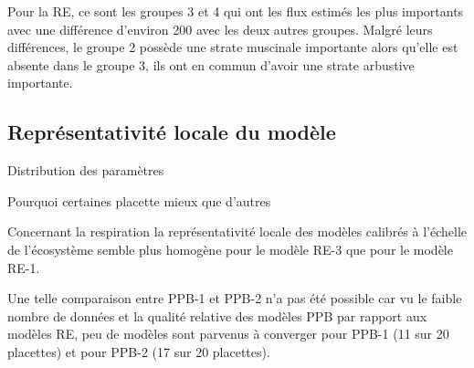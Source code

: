 Pour la RE, ce sont les groupes 3 et 4 qui ont les flux estimés les plus importants avec une différence d'environ \SI{200}{\gcma} avec les deux autres groupes.
Malgré leurs différences, le groupe 2 possède une strate muscinale importante alors qu'elle est absente dans le groupe 3, ils ont en commun d'avoir une strate arbustive importante.

\subsection{Représentativité locale du modèle}

Distribution des paramètres

Pourquoi certaines placette mieux que d'autres

Concernant la respiration la représentativité locale des modèles calibrés à l'échelle de l'écosystème semble plus homogène pour le modèle RE-3 que pour le modèle RE-1.

Une telle comparaison entre PPB-1 et PPB-2 n'a pas été possible car vu le faible nombre de données et la qualité relative des modèles PPB par rapport aux modèles RE, peu de modèles sont parvenus à converger pour PPB-1 (11 sur 20 placettes) et pour PPB-2 (17 sur 20 placettes).
